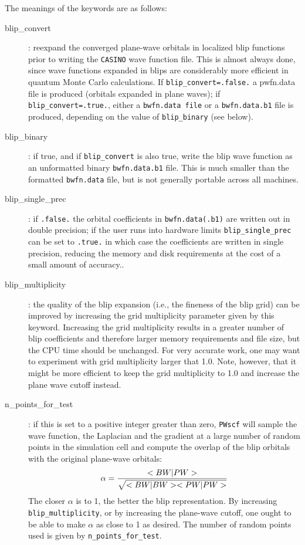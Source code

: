 \documentclass[12pt,a4paper]{article}
\begin{document}
The meanings of the keywords are as follows: 
\begin{description}
\item [blip\_convert]: reexpand the converged plane-wave orbitals in localized blip 
functions prior to writing the \texttt{CASINO} wave function file. This is almost
always done, since wave functions expanded in blips are considerably more
efficient in quantum Monte Carlo calculations. If \texttt{blip\_convert=.false.}
a pwfn.data file is produced (orbitals expanded in plane waves); if 
\texttt{blip\_convert=.true.}, either a \texttt{bwfn.data file} or a \texttt{bwfn.data.b1} file is 
produced, depending on the value of \texttt{blip\_binary} (see below).

\item [blip\_binary]: if true, and if \texttt{blip\_convert} is also true, write the blip wave function
as an unformatted binary \texttt{bwfn.data.b1} file. This is much smaller than
the formatted \texttt{bwfn.data} file, but is not generally portable across
all machines.

\item [blip\_single\_prec]: if \texttt{.false.} the orbital coefficients in \texttt{bwfn.data(.b1)} are written out in double
precision; if the user runs into hardware limits \texttt{blip\_single\_prec} can be
set to \texttt{.true.} in which case the coefficients are written in single
precision, reducing the memory and disk requirements at the cost of a small
amount of accuracy..

\item [blip\_multiplicity]: the quality of the blip expansion (i.e., the fineness of the blip grid) can be
improved by increasing the grid multiplicity parameter given by this keyword.
Increasing the grid multiplicity results in a greater number of blip
coefficients and therefore larger memory requirements and file size, but the
CPU time should be unchanged. For very accurate work, one may want to 
experiment with grid multiplicity larger that 1.0. Note, however, that it 
might be more efficient to keep the grid multiplicity to 1.0 and increase the 
plane wave cutoff instead.

\item [n\_points\_for\_test]: if this is set to a positive integer greater than zero, \texttt{PWscf} will sample 
the wave function, the Laplacian and the gradient at a large number of
random points in the simulation cell and compute the overlap of the
blip orbitals with the original plane-wave orbitals:
$$
\alpha = {<BW|PW> \over  \sqrt{<BW|BW><PW|PW>}}
$$
The closer $\alpha$ is to 1, the better the blip representation.  By increasing
\texttt{blip\_multiplicity}, or by increasing the plane-wave cutoff, one ought to be 
able to make $\alpha$ as close to 1 as desired. The number of random points used 
is given by \texttt{n\_points\_for\_test}.
\end{description}
\end{document}

